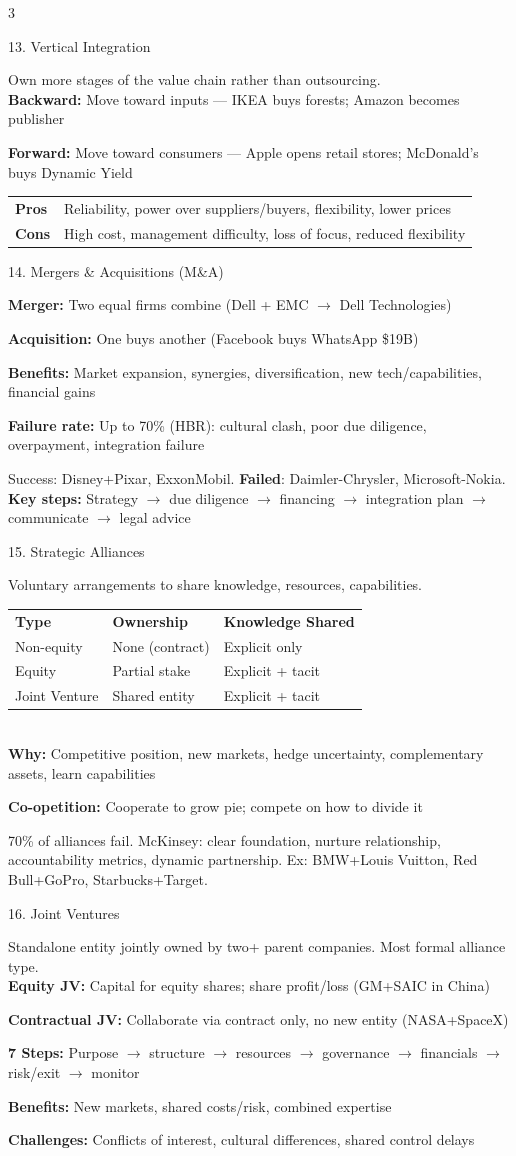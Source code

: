 \documentclass[7.5pt, letterpaper]{article}
\newcommand{\concept}[1]{%
  \vspace{2.5pt}%
  \noindent\colorbox{accent}{\parbox{\dimexpr\linewidth-2\fboxsep}{\fontsize{6.8pt}{7.5pt}\selectfont\bfseries\color{white}\strut #1\strut}}%
  \vspace{1pt}\par%
}
\newcommand{\kv}[2]{\noindent\textbf{#1:} #2\par}
\newcommand{\minitab}[1]{%
  \begingroup
  \fontsize{6.2pt}{7pt}\selectfont
  \setlength{\tabcolsep}{2pt}
  #1
  \endgroup
}
\begin{document}
\begin{multicols}{3}
\concept{13. Vertical Integration}
Own more stages of the value chain rather than outsourcing.\\
\kv{Backward}{Move toward inputs --- IKEA buys forests; Amazon becomes publisher}
\kv{Forward}{Move toward consumers --- Apple opens retail stores; McDonald's buys Dynamic Yield}
\minitab{\begin{tabular}{@{}ll@{}}
\textbf{Pros} & Reliability, power over suppliers/buyers, flexibility, lower prices\\
\textbf{Cons} & High cost, management difficulty, loss of focus, reduced flexibility\\
\end{tabular}}

\concept{14. Mergers \& Acquisitions (M\&A)}
\kv{Merger}{Two equal firms combine (Dell + EMC $\to$ Dell Technologies)}
\kv{Acquisition}{One buys another (Facebook buys WhatsApp \$19B)}
\kv{Benefits}{Market expansion, synergies, diversification, new tech/capabilities, financial gains}
\kv{Failure rate}{Up to 70\% (HBR): cultural clash, poor due diligence, overpayment, integration failure}
Success: Disney+Pixar, ExxonMobil. \textbf{Failed}: Daimler-Chrysler, Microsoft-Nokia.\\
\kv{Key steps}{Strategy $\to$ due diligence $\to$ financing $\to$ integration plan $\to$ communicate $\to$ legal advice}

\concept{15. Strategic Alliances}
Voluntary arrangements to share knowledge, resources, capabilities.\\
\minitab{\begin{tabular}{@{}lll@{}}
\textbf{Type} & \textbf{Ownership} & \textbf{Knowledge Shared}\\
Non-equity & None (contract) & Explicit only\\
Equity & Partial stake & Explicit + tacit\\
Joint Venture & Shared entity & Explicit + tacit\\
\end{tabular}}\\
\kv{Why}{Competitive position, new markets, hedge uncertainty, complementary assets, learn capabilities}
\kv{Co-opetition}{Cooperate to grow pie; compete on how to divide it}
70\% of alliances fail. McKinsey: clear foundation, nurture relationship, accountability metrics, dynamic partnership. Ex: BMW+Louis Vuitton, Red Bull+GoPro, Starbucks+Target.

\concept{16. Joint Ventures}
Standalone entity jointly owned by two+ parent companies. Most formal alliance type.\\
\kv{Equity JV}{Capital for equity shares; share profit/loss (GM+SAIC in China)}
\kv{Contractual JV}{Collaborate via contract only, no new entity (NASA+SpaceX)}
\kv{7 Steps}{Purpose $\to$ structure $\to$ resources $\to$ governance $\to$ financials $\to$ risk/exit $\to$ monitor}
\kv{Benefits}{New markets, shared costs/risk, combined expertise}
\kv{Challenges}{Conflicts of interest, cultural differences, shared control delays}


\end{multicols}
\end{document}
